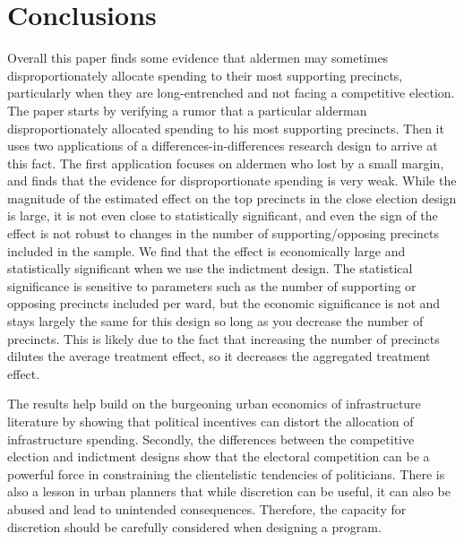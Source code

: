 \section{Conclusions}\label{sec:conclusions}

Overall this paper finds some evidence that aldermen may sometimes disproportionately allocate spending to their most supporting precincts, particularly when they are long-entrenched and not facing a competitive election.
The paper starts by verifying a rumor that a particular alderman disproportionately allocated spending to his most supporting precincts.
Then it uses two applications of a differences-in-differences research design to arrive at this fact.
The first application focuses on aldermen who lost by a small margin, and finds that the evidence for disproportionate spending is very weak.
While the magnitude of the estimated effect on the top precincts in the close election design is large, it is not even close to statistically significant, and even the sign of the effect is not robust to changes in the number of supporting/opposing precincts included in the sample.
We find that the effect is economically large and statistically significant when we use the indictment design.
The statistical significance is sensitive to parameters such as the number of supporting or opposing precincts included per ward, but the economic significance is not and stays largely the same for this design so long as you decrease the number of precincts.
This is likely due to the fact that increasing the number of precincts dilutes the average treatment effect, so it decreases the aggregated treatment effect.

The results help build on the burgeoning urban economics of infrastructure literature by showing that political incentives can distort the allocation of infrastructure spending.
Secondly, the differences between the competitive election and indictment designs show that the electoral competition can be a powerful force in constraining the clientelistic tendencies of politicians.
There is also a lesson in urban planners that while discretion can be useful, it can also be abused and lead to unintended consequences.
Therefore, the capacity for discretion should be carefully considered when designing a program.
